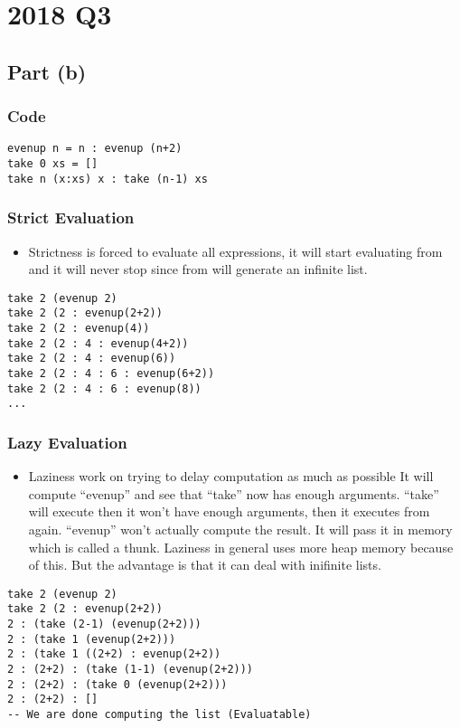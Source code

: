 \documentclass[11pt]{article}
\begin{document}
\section{2018 Q3}
\label{sec:org132144a}
\subsection{Part (b)}
\label{sec:org929667a}
\subsubsection{Code}
\label{sec:orge1cabbe}
\begin{verbatim}
evenup n = n : evenup (n+2)
take 0 xs = []
take n (x:xs) x : take (n-1) xs
\end{verbatim}
\subsubsection{Strict Evaluation}
\label{sec:org6c6071f}
\begin{itemize}
\item Strictness is forced to evaluate all expressions, it will start
evaluating from and it will never stop since from will generate
an infinite list.
\end{itemize}
\begin{verbatim}
take 2 (evenup 2)
take 2 (2 : evenup(2+2))
take 2 (2 : evenup(4))
take 2 (2 : 4 : evenup(4+2))
take 2 (2 : 4 : evenup(6))
take 2 (2 : 4 : 6 : evenup(6+2))
take 2 (2 : 4 : 6 : evenup(8))
...
\end{verbatim}
\subsubsection{Lazy Evaluation}
\label{sec:org052ff67}
\begin{itemize}
\item Laziness work on trying to delay computation as much as possible
It will compute ``evenup'' and see that ``take'' now has enough arguments.
``take'' will execute then it won't have enough arguments, then it executes from
again. ``evenup'' won't actually compute the result. It will pass it in memory
which is called a thunk. Laziness in general uses more heap memory because of this.
But the advantage is that it can deal with inifinite lists.
\end{itemize}
\begin{verbatim}
take 2 (evenup 2)
take 2 (2 : evenup(2+2))
2 : (take (2-1) (evenup(2+2)))
2 : (take 1 (evenup(2+2)))
2 : (take 1 ((2+2) : evenup(2+2))
2 : (2+2) : (take (1-1) (evenup(2+2)))
2 : (2+2) : (take 0 (evenup(2+2)))
2 : (2+2) : []
-- We are done computing the list (Evaluatable)
\end{verbatim}
\end{document}
